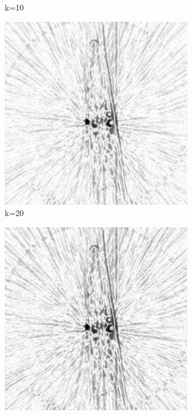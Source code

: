 \documentclass[journal]{IEEEtran}
\begin{document}
\begin{figure}[h]
\begin{subfigure}[b]{0.24\linewidth}
        \caption{k=10}
     \end{subfigure} 
  \begin{subfigure}[b]{0.24\linewidth}
        \includegraphics[width=\textwidth]{../images/okra/post_TCI/2D/48_views/tuning_k/weightsIm_kk_20_lambda_prior_0.700000.png}
        \caption{k=20}
     \end{subfigure}
  \begin{subfigure}[b]{0.24\linewidth}
        \includegraphics[width=\textwidth]{../images/okra/post_TCI/2D/48_views/tuning_k/weightsIm_kk_30_lambda_prior_0.700000.png}

\end{subfigure}
\end{figure}
\end{document}
